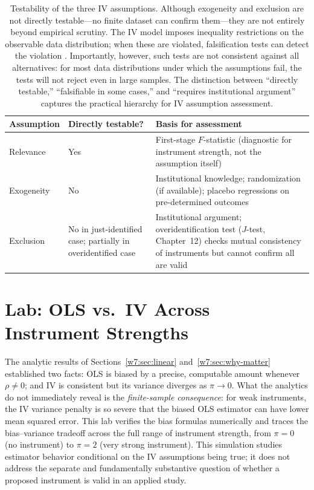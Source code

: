 \documentclass[master.tex]{subfiles}
\begin{document}
\begin{table}[h]
\centering
\renewcommand{\arraystretch}{1.6}
\begin{tabular}{p{2.4cm} p{3.4cm} p{6.0cm}}
  \toprule
  \textbf{Assumption} & \textbf{Directly testable?} & \textbf{Basis for assessment} \\
  \midrule
  Relevance
    & Yes
    & First-stage $F$-statistic (diagnostic for instrument strength,
      not the assumption itself) \\
  Exogeneity
    & No
    & Institutional knowledge; randomization
      (if available); placebo regressions on
      pre-determined outcomes \\
  Exclusion
    & No in just-identified case;
      partially in overidentified case
    & Institutional argument; overidentification
      test ($J$-test, Chapter~12) checks mutual
      consistency of instruments but cannot confirm all
      are valid \\
  \bottomrule
\end{tabular}
\renewcommand{\arraystretch}{1}
\caption{Testability of the three IV assumptions.  Although exogeneity
  and exclusion are not directly testable---no finite dataset can
  confirm them---they are not entirely beyond empirical scrutiny.
  The IV model imposes inequality restrictions on the observable
  data distribution; when these are violated, falsification tests can
  detect the violation \citep{kitagawa2015test, hernan2006instruments}.
  Importantly, however, such tests are not consistent against all
  alternatives: for most data distributions under which the assumptions
  fail, the tests will not reject even in large samples.  The
  distinction between ``directly testable,'' ``falsifiable in some
  cases,'' and ``requires institutional argument'' captures the
  practical hierarchy for IV assumption assessment.}
\label{w7:tab:testability}
\end{table}




\section{Lab: OLS vs.\ IV Across Instrument Strengths}
\label{w7:sec:lab}

The analytic results of Sections~\ref{w7:sec:linear}
and~\ref{w7:sec:why-matter} established two facts: OLS is
biased by a precise, computable amount whenever
$\rho \neq 0$; and IV is consistent but its variance diverges
as $\pi \to 0$.  What the analytics do not immediately reveal
is the \emph{finite-sample consequence}: for weak instruments,
the IV variance penalty is so severe that the biased OLS
estimator can have lower mean squared error.  This lab
verifies the bias formulas numerically and traces the
bias--variance tradeoff across the full range of instrument
strength, from $\pi = 0$ (no instrument) to $\pi = 2$
(very strong instrument).  This simulation studies estimator
behavior conditional on the IV assumptions being true; it does
not address the separate and fundamentally substantive question
of whether a proposed instrument is valid in an applied study.
\end{document}
